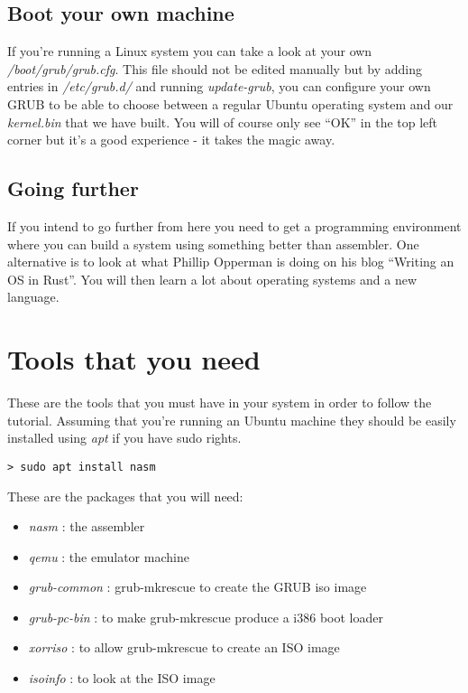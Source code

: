 \documentclass[a4paper,11pt]{article}
\begin{document}
\subsection*{Boot your own machine}

If you're running a Linux system you can take a look at your own {\em
  /boot/grub/grub.cfg}. This file should not be edited manually but
by adding entries in {\em /etc/grub.d/} and running {\em update-grub},
you can configure your own GRUB to be able to choose between a regular
Ubuntu operating system and our {\em kernel.bin} that we have
built. You will of course only see ``OK'' in the top left corner but
it's a good experience - it takes the magic away. 

\subsection*{Going further}

If you intend to go further from here you need to get a programming
environment where you can build a system using something better than
assembler. One alternative is to look at what Phillip Opperman is
doing on his blog ``Writing an OS in Rust''. You will then learn a lot
about operating systems and a new language.

\pagebreak
\section*{Tools that you need}

These are the tools that you must have in your system in order to
follow the tutorial. Assuming that you're running an Ubuntu machine
they should be easily installed using {\em apt} if you have sudo
rights.

\begin{verbatim}
> sudo apt install nasm 
\end{verbatim}

These are the packages that you will need:

\begin{itemize}
\item {\em nasm} : the assembler
\item {\em qemu} : the emulator machine
\item {\em grub-common} : grub-mkrescue to create the GRUB iso image 
\item {\em grub-pc-bin} : to make grub-mkrescue  produce a i386 boot loader
\item {\em xorriso} : to allow grub-mkrescue to create an ISO image
\item {\em isoinfo} : to look at the ISO image
\end{itemize}
\end{document}
